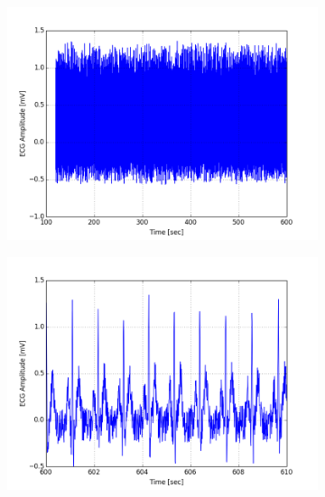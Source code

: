 \documentclass[paper=a4, fontsize=11pt]{scrartcl}
\numberwithin{equation}{section}		%
\numberwithin{figure}{section}			%
\numberwithin{table}{section}		    %
\begin{document}
\begin{appendices}
\begin{figure}[H]
	\centering
	\begin{subfigure}[b]{0.3\textwidth}
		\includegraphics[width=\textwidth]{sim/ecg_13}
	\end{subfigure}
	\begin{subfigure}[b]{0.3\textwidth}
		\includegraphics[width=\textwidth]{sim/ecg_14}
	\end{subfigure}
	\begin{subfigure}[b]{0.3\textwidth}

\end{subfigure}
\end{figure}
\end{appendices}
\end{document}
